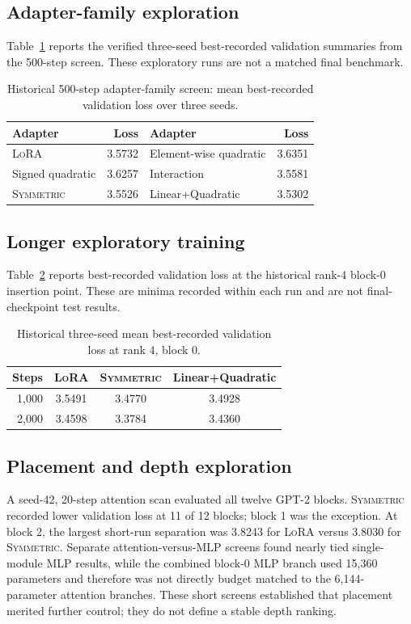 \documentclass[11pt]{article}
\newcommand{\sym}{\textsc{Symmetric}}\newcommand{\lora}{\textsc{LoRA}}
\begin{document}
\subsection{Adapter-family exploration}
Table~\ref{tab:hist-family} reports the verified three-seed best-recorded validation summaries from the 500-step screen. These exploratory runs are not a matched final benchmark.
\begin{table}[htbp]\centering\small
\caption{Historical 500-step adapter-family screen: mean best-recorded validation loss over three seeds.}\label{tab:hist-family}
\begin{tabular}{lr@{\qquad}lr}\toprule
Adapter&Loss&Adapter&Loss\\\midrule
\lora{}&3.5732&Element-wise quadratic&3.6351\\
Signed quadratic&3.6257&Interaction&3.5581\\
\sym{}&3.5526&Linear+Quadratic&3.5302\\\bottomrule
\end{tabular}\end{table}

\subsection{Longer exploratory training}
Table~\ref{tab:hist-duration} reports best-recorded validation loss at the historical rank-4 block-0 insertion point. These are minima recorded within each run and are not final-checkpoint test results.
\begin{table}[htbp]\centering\small
\caption{Historical three-seed mean best-recorded validation loss at rank 4, block 0.}\label{tab:hist-duration}
\begin{tabular}{rccc}\toprule
Steps&\lora{}&\sym{}&Linear+Quadratic\\\midrule
1,000&3.5491&3.4770&3.4928\\
2,000&3.4598&3.3784&3.4360\\\bottomrule
\end{tabular}\end{table}

\subsection{Placement and depth exploration}
A seed-42, 20-step attention scan evaluated all twelve GPT-2 blocks. \sym{} recorded lower validation loss at 11 of 12 blocks; block 1 was the exception. At block 2, the largest short-run separation was 3.8243 for \lora{} versus 3.8030 for \sym{}. Separate attention-versus-MLP screens found nearly tied single-module MLP results, while the combined block-0 MLP branch used 15,360 parameters and therefore was not directly budget matched to the 6,144-parameter attention branches. These short screens established that placement merited further control; they do not define a stable depth ranking.
\end{document}
